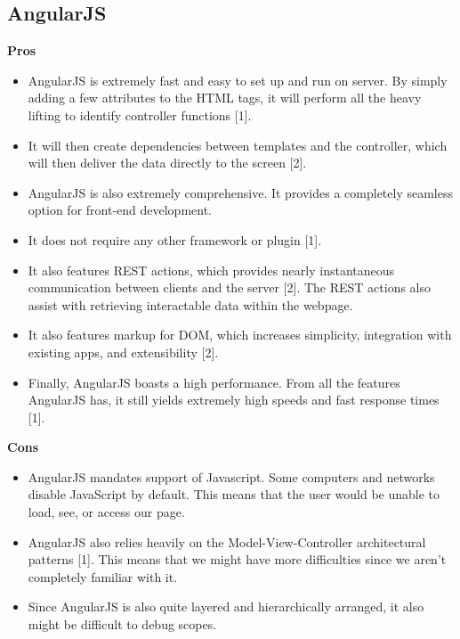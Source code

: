 \documentclass[onecolumn, draftclsnofoot,10pt, compsoc]{IEEEtran}
\begin{document}
	\subsection{AngularJS}
	\textbf{Pros}
		\begin{itemize}
			\item AngularJS is extremely fast and easy to set up and run on server. By simply adding a few attributes to the HTML tags, it will perform all the heavy lifting to identify controller functions [1]. 
			\item It will then create dependencies between templates and the controller, which will then deliver the data directly to the screen [2]. 
			\item AngularJS is also extremely comprehensive. It provides a completely seamless option for front-end development. 
			\item It does not require any other framework or plugin [1]. 
			\item It also features REST actions, which provides nearly instantaneous communication between clients and the server [2]. The REST actions also assist with retrieving interactable data within the webpage. 
			\item It also features markup for DOM, which increases simplicity, integration with existing apps, and extensibility [2]. 
			\item Finally, AngularJS boasts a high performance. From all the features AngularJS has, it still yields extremely high speeds and fast response times [1].
		\end{itemize}
  \textbf{Cons}
		\begin{itemize}
			\item AngularJS mandates support of Javascript. Some computers and networks disable JavaScript by default. This means that the user would be unable to load, see, or access our page. 
			\item AngularJS also relies heavily on the Model-View-Controller architectural patterns [1]. This means that we might have more difficulties since we aren't completely familiar with it. 
			\item Since AngularJS is also quite layered and hierarchically arranged, it also might be difficult to debug scopes.
		\end{itemize}
\end{document}
